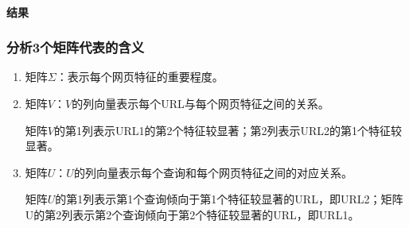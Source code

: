 \documentclass{article}
\begin{document}
\paragraph{结果}

\subsubsection{分析3个矩阵代表的含义}
\begin{enumerate}[label = {\Roman*.}]
\item 矩阵$\Sigma$：表示每个网页特征的重要程度。
\item 矩阵$V$：$V$的列向量表示每个URL与每个网页特征之间的关系。

矩阵$V$的第1列表示URL1的第2个特征较显著；第2列表示URL2的第1个特征较显著。

\item 矩阵$U$：$U$的列向量表示每个查询和每个网页特征之间的对应关系。

矩阵$U$的第1列表示第1个查询倾向于第1个特征较显著的URL，即URL2；矩阵U的第2列表示第2个查询倾向于第2个特征较显著的URL，即URL1。

\end{enumerate}
\end{document}

